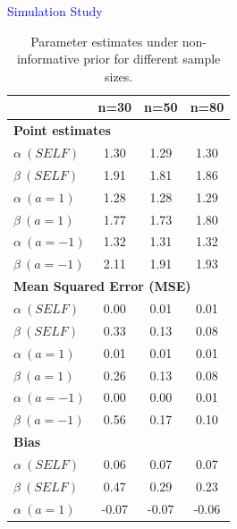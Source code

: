 \documentclass[final]{beamer}
\newlength{\colwidth}
\begin{document}
\begin{frame}[t]
\begin{columns}[t]
\begin{column}{\colwidth}
\begin{block}{\textcolor{blue}{Simulation Study}}
{\small\begin{table}[h!]
    \centering
    \caption{Parameter estimates under non-informative prior for different sample sizes.}
    \label{tab:results2}
    \begin{tabular}{lccc}
        \toprule
             & \textbf{n=30} & \textbf{n=50} & \textbf{n=80} \\
        \midrule
        \multicolumn{4}{l}{\textbf{Point estimates}} \\
        $\alpha \ (SELF)$               & 1.30          & 1.29          & 1.30          \\
        $\beta \ (SELF)$                & 1.91          & 1.81          & 1.86          \\
        $\alpha \ (a=1)$       & 1.28          & 1.28          & 1.29          \\
        $\beta \ (a=1)$        & 1.77          & 1.73          & 1.80          \\
        $\alpha \ (a=-1)$      & 1.32          & 1.31          & 1.32          \\
        $\beta \ (a=-1)$       & 2.11          & 1.91          & 1.93          \\
        \midrule
        \multicolumn{4}{l}{\textbf{Mean Squared Error (MSE)}} \\
        $\alpha \ (SELF)$               & 0.00          & 0.01          & 0.01          \\
        $\beta \ (SELF)$                & 0.33          & 0.13          & 0.08          \\
        $\alpha \ (a=1)$       & 0.01          & 0.01          & 0.01          \\
        $\beta \ (a=1)$        & 0.26          & 0.13          & 0.08          \\
        $\alpha \ (a=-1)$      & 0.00          & 0.00          & 0.01          \\
        $\beta \ (a=-1)$       & 0.56          & 0.17          & 0.10          \\
        \midrule
        \multicolumn{4}{l}{\textbf{Bias}} \\
        $\alpha \ (SELF)$               & 0.06          & 0.07          & 0.07          \\
        $\beta \ (SELF)$                & 0.47          & 0.29          & 0.23          \\
        $\alpha \ (a=1)$       & -0.07         & -0.07         & -0.06         \\

\end{tabular}
\end{table}}
\end{block}
\end{column}
\end{columns}
\end{frame}
\end{document}
